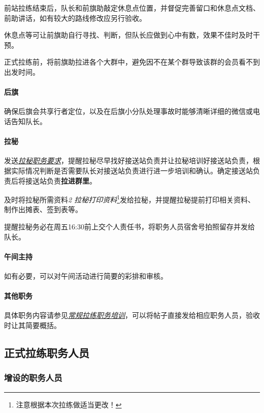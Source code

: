 \documentclass[UTF8]{ctexart}
\begin{document}
前站拉练结束后，队长和前旗助敲定休息点位置，并督促完善留口和休息点文档、前助讲话，如有较大的路线修改应另行验收。

休息点等可让前旗助自行寻找、判断，但队长应做到心中有数，效果不佳时及时干预。

正式拉练前，将前旗助拉进各个大群中，避免因不在某个群导致该群的会员看不到出发时间。

\paragraph{后旗}

确保后旗会共享行者定位，以及在后旗小分队处理事故时能够清晰详细的微信或电话告知队长。

\paragraph{拉秘}

发送\href{https://chexie.net/bbs/content/?bid=7&tid=1062&p=1#7}{\textit{拉秘职务要求}}，提醒拉秘尽早找好接送站负责并让拉秘培训好接送站负责，根据实际情况判断是否需要队长对接送站负责进行进一步培训和确认。确定接送站负责后将接送站负责\textbf{拉进群里}。

及时将拉秘所需资料{\color{blue}\textit{2 拉秘打印资料}}\footnote{注意根据本次拉练做适当更改！}发给拉秘，并提醒拉秘提前打印相关资料、制作出摊表、签到表等。

提醒拉秘务必在周五16:30前上交个人责任书，将职务人员宿舍号拍照留存并发给队长。

\paragraph{午间主持} 如有必要，可以对午间活动进行简要的彩排和审核。

\paragraph{其他职务}

具体职务内容请参见\href{https://chexie.net/bbs/content/?bid=7&tid=1062&p=1}{\textit{常规拉练职务培训}}，可以将帖子直接发给相应职务人员，验收时让其简要概括。

\subsection{正式拉练职务人员}

\subsubsection{增设的职务人员}
\end{document}
